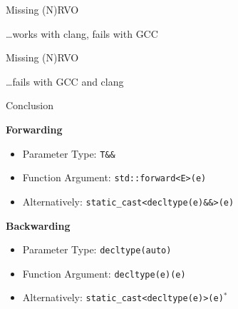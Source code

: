 \documentclass[compress,aspectratio=1610]{beamer}
\newcommand{\inputcpplisting}[1]{}
\begin{document}
\begin{frame}[fragile]{Missing (N)RVO}
    \inputcpplisting{snippet19b}

    \hfill \ldots works with clang, fails with GCC
\end{frame}

\begin{frame}[fragile]{Missing (N)RVO}
    \inputcpplisting{snippet19c}

    \hfill \ldots fails with GCC and clang
\end{frame}

\begin{frame}{Conclusion}
    \begin{center}
    \end{center}
    
    \textbf{Forwarding}
    \begin{itemize}
        \item Parameter Type: \texttt{T\&\&}
        \item Function Argument: \texttt{std::forward<E>(e)}
        \item Alternatively: \texttt{static\_cast<decltype(e)\&\&>(e)}
    \end{itemize}

    \textbf{Backwarding}
    \begin{itemize}
        \item Parameter Type: \texttt{decltype(auto)}
        \item Function Argument: \texttt{decltype(e)(e)}
        \item Alternatively: \texttt{static\_cast<decltype(e)>(e)}$^*$
    \end{itemize}
\end{frame}
\end{document}
